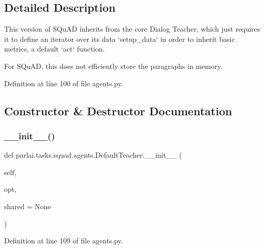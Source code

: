 \subsection{Detailed Description}
\begin{DoxyVerb}This version of SQuAD inherits from the core Dialog Teacher, which just requires it
to define an iterator over its data `setup_data` in order to inherit basic metrics,
a default `act` function.

For SQuAD, this does not efficiently store the paragraphs in memory.
\end{DoxyVerb}
 

Definition at line 100 of file agents.\+py.



\subsection{Constructor \& Destructor Documentation}
\mbox{\label{classparlai_1_1tasks_1_1squad_1_1agents_1_1DefaultTeacher_a22833504fb2903d282c7415396bfb3dd}} 
\subsubsection{\texorpdfstring{\+\_\+\+\_\+init\+\_\+\+\_\+()}{\_\_init\_\_()}}
{\footnotesize\ttfamily def parlai.\+tasks.\+squad.\+agents.\+Default\+Teacher.\+\_\+\+\_\+init\+\_\+\+\_\+ (\begin{DoxyParamCaption}\item[{}]{self,  }\item[{}]{opt,  }\item[{}]{shared = {\ttfamily None} }\end{DoxyParamCaption})}



Definition at line 109 of file agents.\+py.


